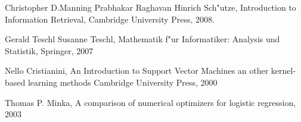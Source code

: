 \documentclass[12pt,a4paper,twoside]{article}
\begin{document}


\begin{thebibliography}{99}
Christopher D.Manning Prabhakar Raghavan Hinrich Sch"utze,
Introduction to Information Retrieval,
Cambridge University Press,
2008.

Gerald Teschl Susanne Teschl,
Mathematik f"ur Informatiker: Analysis und Statistik,
Springer,
2007

Nello Cristianini,
An Introduction to Support Vector Machines an other kernel-based learning methods
Cambridge University Press,
2000

Thomas P. Minka,
A comparison of numerical optimizers for logistic regression,
2003

\end{thebibliography}
\end{document}
